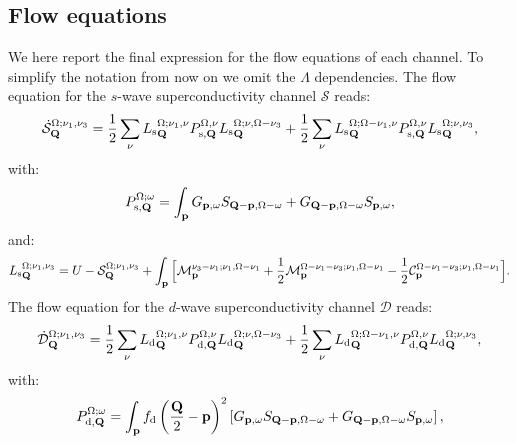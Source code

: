 \subsection{Flow equations}

We here report the final expression for the flow equations of each channel.
To simplify the notation from now on  we omit the $\Lambda$ dependencies.
The flow equation for the $s$-wave superconductivity channel $\mathcal{S}$ reads:
\begin{equation}
\dot{\mathcal{S}}_{\mathbf{Q}}^{\Omega;\nu_1,\nu_3} = 
  \frac{1}{2} \sum_{\nu}{L_\mathrm{s}}^{\Omega; \nu_1,\nu}_{\mathbf{Q}} P_{\mathrm{s},\mathbf{Q}}^{\Omega,\nu} {L_\mathrm{s}}^{\Omega; \nu,\Omega-\nu_3}_{\mathbf{Q}} 
+ \frac{1}{2} \sum_{\nu}{L_\mathrm{s}}^{\Omega; \Omega-\nu_1,\nu}_{\mathbf{Q}} P_{\mathrm{s},\mathbf{Q}}^{\Omega,\nu} {L_\mathrm{s}}^{\Omega; \nu,\nu_3}_{\mathbf{Q}},
\end{equation} 	   
with: 
\begin{equation}
P_{\mathrm{s},\mathbf{Q}}^{\Omega;\omega} = \int_{\mathbf{p}}  G_{\mathbf{p},\omega}S_{\mathbf{Q}-\mathbf{p},\Omega-\omega} +G_{\mathbf{Q}-\mathbf{p},\Omega-\omega}
S_{\mathbf{p},\omega}, 
\label{eq:app:P_pp}
\end{equation} 
and: 
\begin{align} 
\label{eq:Lswave}
{L_\mathrm{s}}^{\Omega;\nu_1,\nu_3}_{\mathbf{Q}}=U-\mathcal{S}_{\mathbf{Q}}^{\Omega;\nu_1,\nu_3}
+ \int_{\mathbf{p}}  \Big[ \mathcal{M}_{\mathbf{p}}^{\nu_3-\nu_1;\nu_1,\Omega-\nu_1} + \frac{1}{2} \mathcal{M}_{\mathbf{p}}^{\Omega-\nu_1-\nu_3;\nu_1,\Omega-\nu_1} - \frac{1}{2} \mathcal{C}_{\mathbf{p}}^{\Omega-\nu_1-\nu_3;\nu_1,\Omega-\nu_1} \Big]. 
\end{align}	 
The flow equation for the $d$-wave superconductivity channel  $\mathcal{D}$ reads:
\begin{equation}
\dot{\mathcal{D}}_{\mathbf{Q}}^{\Omega;\nu_1,\nu_3} = 
  \frac{1}{2} \sum_{\nu}{L_\mathrm{d}}^{\Omega; \nu_1,\nu}_{\mathbf{Q}} P_{\mathrm{d},\mathbf{Q}}^{\Omega,\nu} {L_\mathrm{d}}^{\Omega; \nu,\Omega-\nu_3}_{\mathbf{Q}} 
+ \frac{1}{2} \sum_{\nu}{L_\mathrm{d}}^{\Omega; \Omega-\nu_1,\nu}_{\mathbf{Q}} P_{\mathrm{d},\mathbf{Q}}^{\Omega,\nu} {L_\mathrm{d}}^{\Omega; \nu,\nu_3}_{\mathbf{Q}},
\label{eq:dwaveflow}
\end{equation}
with: 
\begin{equation}
P_{\mathrm{d},\mathbf{Q}}^{\Omega;\omega} = \int_{\mathbf{p}}  f_{\mathrm{d}}\left(\frac{\mathbf{Q}}{2}-\mathbf{p}\right)^2 \left[ G_{\mathbf{p},\omega}S_{\mathbf{Q}-\mathbf{p},\Omega-\omega} +G_{\mathbf{Q}-\mathbf{p},\Omega-\omega}
S_{\mathbf{p},\omega} \right], 
\label{eq:app:P_pp}
\end{equation} 
